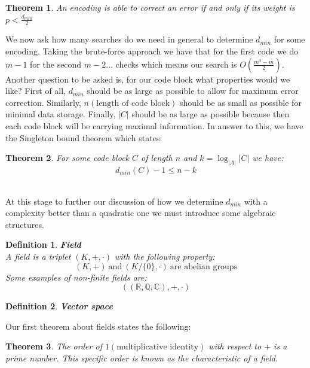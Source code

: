 \documentclass[titlepage]{article}
\newtheorem{theorem}{Theorem}[section]
\newtheorem{definition}{Definition}
\begin{document}
\begin{theorem}
An encoding is able to correct an error if and only if its weight is $p < \frac{d_{min}}{2}$
\end{theorem}

We now ask how many searches do we need in general to determine $d_{min}$ for some encoding. Taking the brute-force approach we have that for the first code we do $m-1$ for the second $m-2$... checks which means our search is $O(\frac{m^{2}-m}{2})$. 
\\

Another question to be asked is, for our code block what properties would we like? First of all, $d_{min}$ should be as large as possible to allow for maximum error correction. Similarly, $n(\text{length of code block})$ should be as small as possible for minimal data storage. Finally, $|C|$ should be as large as possible because then each code block will be carrying maximal information. In answer to this, we have the Singleton bound theorem which states:

\begin{theorem}
For some code block $C$ of length $n$ and $k = \log_{|A|}{|C|}$ we have:
$$d_{min}(C) - 1 \leq n- k$$
\end{theorem}
\\

At this stage to further our discussion of how we determine $d_{min}$ with a complexity better than a quadratic one we must introduce some algebraic structures. 

\begin{definition} \textbf{Field}
\\
A field is a triplet $(K, + , \cdot)$ with the following property:
$$ (K, +) \ \text{and} \ (K/\{0\}, \cdot) \ \text{are abelian groups}$$
Some examples of non-finite fields are:
$$((\mathbb{R}, \mathbb{Q}, \mathbb{C}), +, \cdot)$$
\end{definition}

\begin{definition} \textbf{Vector space}
\\

\end{definition}

Our first theorem about fields states the following:

\begin{theorem}
The order of $1(\text{multiplicative identity})$ with respect to $+$ is a prime number. This specific order is known as the characteristic of a field.
\end{theorem}
\end{document}
